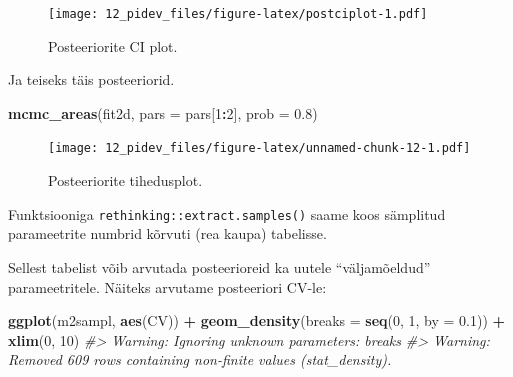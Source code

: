 \documentclass[]{book}
\newenvironment{Shaded}{\begin{snugshade}}{\end{snugshade}}
\newcommand{\KeywordTok}[1]{\textcolor[rgb]{0.13,0.29,0.53}{\textbf{#1}}}
\newcommand{\DataTypeTok}[1]{\textcolor[rgb]{0.13,0.29,0.53}{#1}}
\newcommand{\DecValTok}[1]{\textcolor[rgb]{0.00,0.00,0.81}{#1}}
\newcommand{\FloatTok}[1]{\textcolor[rgb]{0.00,0.00,0.81}{#1}}
\newcommand{\StringTok}[1]{\textcolor[rgb]{0.31,0.60,0.02}{#1}}
\newcommand{\CommentTok}[1]{\textcolor[rgb]{0.56,0.35,0.01}{\textit{#1}}}
\newcommand{\OperatorTok}[1]{\textcolor[rgb]{0.81,0.36,0.00}{\textbf{#1}}}
\newcommand{\NormalTok}[1]{#1}
\begin{document}
\begin{figure}
\centering
\texttt{[image: 12\_pidev\_files/figure-latex/postciplot-1.pdf]}
\caption{\label{fig:postciplot}Posteeriorite CI plot.}
\end{figure}

Ja teiseks täis posteeriorid.

\begin{Shaded}
\begin{Highlighting}[]
\KeywordTok{mcmc_areas}\NormalTok{(fit2d, }\DataTypeTok{pars =}\NormalTok{ pars[}\DecValTok{1}\OperatorTok{:}\DecValTok{2}\NormalTok{], }\DataTypeTok{prob =} \FloatTok{0.8}\NormalTok{)}
\end{Highlighting}
\end{Shaded}

\begin{figure}
\centering
\texttt{[image: 12\_pidev\_files/figure-latex/unnamed-chunk-12-1.pdf]}
\caption{\label{fig:unnamed-chunk-12}Posteeriorite tihedusplot.}
\end{figure}

Funktsiooniga \texttt{rethinking::extract.samples()} saame koos
sämplitud parameetrite numbrid kõrvuti (rea kaupa) tabelisse.

\begin{Shaded}
\end{Shaded}

Sellest tabelist võib arvutada posteerioreid ka uutele ``väljamõeldud''
parameetritele. Näiteks arvutame posteeriori CV-le:

\begin{Shaded}
\begin{Highlighting}[]
\KeywordTok{ggplot}\NormalTok{(m2sampl, }\KeywordTok{aes}\NormalTok{(CV)) }\OperatorTok{+}\StringTok{ }
\StringTok{  }\KeywordTok{geom_density}\NormalTok{(}\DataTypeTok{breaks =} \KeywordTok{seq}\NormalTok{(}\DecValTok{0}\NormalTok{, }\DecValTok{1}\NormalTok{, }\DataTypeTok{by =} \FloatTok{0.1}\NormalTok{)) }\OperatorTok{+}\StringTok{ }
\StringTok{  }\KeywordTok{xlim}\NormalTok{(}\DecValTok{0}\NormalTok{, }\DecValTok{10}\NormalTok{)}
\CommentTok{#> Warning: Ignoring unknown parameters: breaks}
\CommentTok{#> Warning: Removed 609 rows containing non-finite values (stat_density).}
\end{Highlighting}
\end{Shaded}
\end{document}

